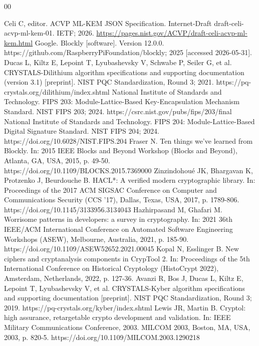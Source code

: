 \documentclass[preprint,12pt,a4paper]{elsarticle}
\begin{document}
\begin{thebibliography}{00}

	Celi C, editor. ACVP ML-KEM JSON Specification. Internet-Draft draft-celi-acvp-ml-kem-01. IETF; 2026. \url{https://pages.nist.gov/ACVP/draft-celi-acvp-ml-kem.html}
	Google. Blockly [software]. Version 12.0.0. https://github.com/RaspberryPiFoundation/blockly; 2025 [accessed 2026-05-31].
	Ducas L, Kiltz E, Lepoint T, Lyubashevsky V, Schwabe P, Seiler G, et al. CRYSTALS-Dilithium algorithm specifications and supporting documentation (version 3.1) [preprint]. NIST PQC Standardization, Round 3; 2021. https://pq-crystals.org/dilithium/index.shtml
	National Institute of Standards and Technology. FIPS 203: Module-Lattice-Based Key-Encapsulation Mechanism Standard. NIST FIPS 203; 2024. https://csrc.nist.gov/pubs/fips/203/final
	National Institute of Standards and Technology. FIPS 204: Module-Lattice-Based Digital Signature Standard. NIST FIPS 204; 2024. https://doi.org/10.6028/NIST.FIPS.204
	Fraser N. Ten things we've learned from Blockly. In: 2015 IEEE Blocks and Beyond Workshop (Blocks and Beyond), Atlanta, GA, USA, 2015, p. 49-50. https://doi.org/10.1109/BLOCKS.2015.7369000
	Zinzindohou\'e JK, Bhargavan K, Protzenko J, Beurdouche B. HACL*: A verified modern cryptographic library. In: Proceedings of the 2017 ACM SIGSAC Conference on Computer and Communications Security (CCS '17), Dallas, Texas, USA, 2017, p. 1789-806. https://doi.org/10.1145/3133956.3134043
	Hazhirpasand M, Ghafari M. Worrisome patterns in developers: a survey in cryptography. In: 2021 36th IEEE/ACM International Conference on Automated Software Engineering Workshops (ASEW), Melbourne, Australia, 2021, p. 185-90. https://doi.org/10.1109/ASEW52652.2021.00045
	Kopal N, Esslinger B. New ciphers and cryptanalysis components in CrypTool 2. In: Proceedings of the 5th International Conference on Historical Cryptology (HistoCrypt 2022), Amsterdam, Netherlands, 2022, p. 127-36.
	Avanzi R, Bos J, Ducas L, Kiltz E, Lepoint T, Lyubashevsky V, et al. CRYSTALS-Kyber algorithm specifications and supporting documentation [preprint]. NIST PQC Standardization, Round 3; 2019. https://pq-crystals.org/kyber/index.shtml
	Lewis JR, Martin B. Cryptol: high assurance, retargetable crypto development and validation. In: IEEE Military Communications Conference, 2003. MILCOM 2003, Boston, MA, USA, 2003, p. 820-5. https://doi.org/10.1109/MILCOM.2003.1290218

\end{thebibliography}
\end{document}
